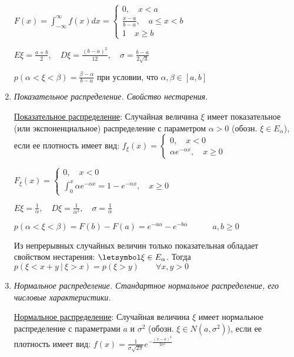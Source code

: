 \begin{enumerate}
    $F(x) = \int_{-\infty}^\infty f(x)dx = \begin{cases}0, \quad x < a \\ \frac{x - a}{b - a}, \quad a \leq x < b \\ 1 \quad x \geq b\end{cases}$

    $E\xi = \frac{a + b}{2}, \quad D\xi = \frac{(b - a)^2}{12}, \quad \sigma = \frac{b - a}{2\sqrt{3}}$

    $p(\alpha < \xi < \beta) = \frac{\beta - \alpha}{b - a}$ при условии, что $\alpha, \beta \in [a, b]$

    \item \textit{Показательное распределение. Свойство нестарения.}

    \hyperlink{exponentialdistribution}{Показательное распределение}: Случайная величина $\xi$ имеет показательное (или экспоненциальное) распределение с параметром $\alpha > 0$ (обозн. $\xi \in E_\alpha$),
    если ее плотность имеет вид: $f_\xi(x) = \begin{cases}0, \quad x < 0 \\ \alpha e^{-\alpha x}, \quad x \geq 0\end{cases}$

    $F_\xi(x) = \begin{cases}0, \quad x < 0 \\ \int_0^x \alpha e^{-\alpha x} = 1 - e^{-\alpha x}, \quad x \geq 0\end{cases}$

    $E\xi = \frac{1}{\alpha}, \quad D\xi = \frac{1}{\alpha^2}, \quad \sigma = \frac{1}{\alpha}$

    $p(\alpha < \xi < \beta) = F(b) - F(a) = e^{-a\alpha} - e^{-b\alpha} \quad\quad\quad a, b \geq 0$

    Из непрерывных случайных величин только показательная обладает свойством нестарения:
    \Ths $\letsymbol \xi \in E_\alpha$. Тогда $p(\xi < x + y \ | \ \xi > x) = p(\xi > y) \quad\quad \forall x, y > 0$

    \item \textit{Нормальное распределение. Стандартное нормальное распределение, его числовые характеристики.}

    \hyperlink{normaldistribution}{Нормальное распределение}: Случайная величина $\xi$ имеет нормальное распределение с параметрами $a$ и $\sigma^2$ (обозн. $\xi \in N(a, \sigma^2)$), если
    ее плотность имеет вид: $f(x) = \frac{1}{\sigma \sqrt{2\pi}} e^{-\frac{(x - a)^2}{2\sigma^2}}$


\end{enumerate}
